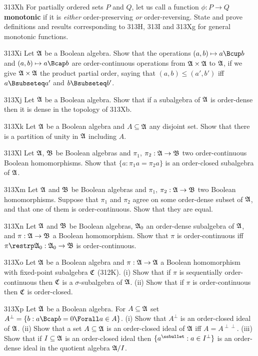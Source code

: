 {\spheader 313Xh For partially ordered sets $P$ and $Q$, let us
call a function $\phi:P\to Q$ {\bf monotonic} if it is {\it either}
order-preserving {\it or} order-reversing.   State and prove definitions
and results corresponding to 313H, 313I and 313Xg for general monotonic
functions.

\sqheader 313Xi Let $\frak A$ be a Boolean algebra.   Show that
the operations $(a,b)\mapsto a\Bcup b$ and $(a,b)\mapsto a\Bcap b$ are
order-continuous operations from $\frak A\times\frak A$ to $\frak A$,
if we give $\frak A\times\frak A$ the product partial order, saying that
$(a,b)\le (a',b')$ iff $a\Bsubseteq a'$ and $b\Bsubseteq b'$.

\spheader 313Xj Let $\frak A$ be a Boolean algebra.   Show that if a
subalgebra of $\frak A$ is order-dense then it is dense in the topology
of 313Xb.

\sqheader 313Xk Let $\frak A$ be a Boolean algebra and
$A\subseteq\frak A$ any disjoint set.   Show that there is a partition
of unity in $\frak A$ including $A$.

\sqheader 313Xl Let $\frak A$, $\frak B$ be Boolean algebras and
$\pi_1$, $\pi_2:\frak A\to\frak B$ two order-continuous Boolean
homomorphisms.   Show that $\{a:\pi_1a=\pi_2a\}$ is an order-closed
subalgebra of $\frak A$.

\spheader 313Xm Let $\frak A$ and $\frak B$ be Boolean algebras and
$\pi_1$, $\pi_2:\frak A\to\frak B$ two Boolean homomorphisms.   Suppose
that $\pi_1$ and $\pi_2$ agree on some order-dense subset of $\frak A$,
and that one of them is order-continuous.   Show that they are equal.

\spheader 313Xn Let $\frak A$ and $\frak B$ be Boolean algebras,
$\frak A_0$ an order-dense subalgebra of $\frak A$, and
$\pi:\frak A\to\frak B$ a Boolean homomorphism.   Show that $\pi$ is
order-continuous iff $\pi\restrp\frak A_0:\frak A_0\to\frak B$ is
order-continuous.

\spheader 313Xo Let $\frak A$ be a Boolean algebra and
$\pi:\frak A\to\frak A$ a Boolean homomorphism with fixed-point
subalgebra $\frak C$ (312K).   (i) Show that if $\pi$ is sequentially
order-continuous then $\frak C$ is a $\sigma$-subalgebra of $\frak A$.
(ii) Show that if $\pi$ is order-continuous then $\frak C$ is
order-closed.

\sqheader 313Xp Let $\frak A$ be a Boolean algebra.   For
$A\subseteq\frak A$ set $A^{\perp}=\{b:a\Bcap b=0\Forall a\in A\}$.
(i) Show that
$A^{\perp}$ is an order-closed ideal of $\frak A$.   (ii) Show that a
set $A\subseteq\frak A$ is
an order-closed ideal of $\frak A$ iff $A=A^{\perp\perp}$.
(iii) Show that if $I\subseteq\frak A$ is an order-closed ideal then
$\{a^{\ssbullet}:a\in I^{\perp}\}$ is an order-dense ideal in the
quotient algebra $\frak A/I$.

}

